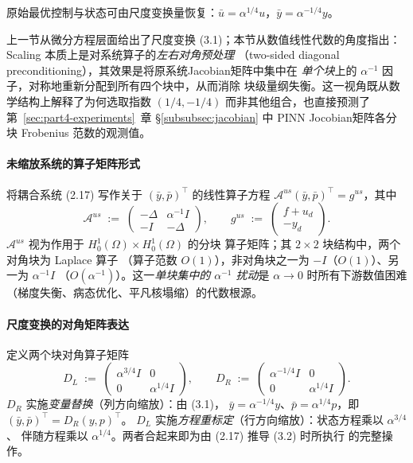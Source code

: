 \documentclass{xmu}
\theoremstyle{plain}
\theoremstyle{remark}
\begin{document}
原始最优控制与状态可由尺度变换量恢复：$\bar{u} = \alpha^{1/4}u$，$\bar{y} = \alpha^{-1/4}y$。


\label{subsec:jacobian-balancing}

上一节从微分方程层面给出了尺度变换 (3.1)；本节从数值线性代数的角度指出：
Scaling 本质上是对系统算子的\emph{左右对角预处理}
（two-sided diagonal preconditioning），其效果是将原系统Jacobian矩阵中集中在
\emph{单个块}上的 $\alpha^{-1}$ 因子，对称地重新分配到所有四个块中，从而消除
块级量纲失衡。这一视角既从数学结构上解释了为何选取指数 $(1/4,-1/4)$
而非其他组合，也直接预测了第~\ref{sec:part4-experiments}~章
§\ref{subsubsec:jacobian} 中 PINN Jocobian矩阵各分块 Frobenius 范数的观测值。

\paragraph{未缩放系统的算子矩阵形式}
将耦合系统 (2.17) 写作关于 $(\bar y,\bar p)^{\top}$ 的线性算子方程
$\mathcal{A}^{us}(\bar y,\bar p)^{\top} = g^{us}$，其中
\begin{equation}
\mathcal{A}^{us} \;:=\; \begin{pmatrix} -\Delta & \alpha^{-1}I \\[2pt] -I & -\Delta \end{pmatrix},
\qquad
g^{us} \;:=\; \begin{pmatrix} f+u_d \\[2pt] -y_d \end{pmatrix}.
\label{eq:A-us}
\end{equation}
$\mathcal{A}^{us}$ 视为作用于 $H_0^1(\Omega)\times H_0^1(\Omega)$ 的分块
算子矩阵；其 $2\times 2$ 块结构中，两个对角块为 Laplace 算子
（算子范数 $O(1)$），非对角块之一为 $-I$（$O(1)$）、另一为 $\alpha^{-1}I$
（$O(\alpha^{-1})$）。这一\emph{单块集中的 $\alpha^{-1}$ 扰动}是 $\alpha\to 0$
时所有下游数值困难（梯度失衡、病态优化、平凡核塌缩）的代数根源。

\paragraph{尺度变换的对角矩阵表达}
定义两个块对角算子矩阵
\begin{equation}
D_L \;:=\; \begin{pmatrix} \alpha^{3/4}I & 0 \\[2pt] 0 & \alpha^{1/4}I \end{pmatrix},
\qquad
D_R \;:=\; \begin{pmatrix} \alpha^{-1/4}I & 0 \\[2pt] 0 & \alpha^{1/4}I \end{pmatrix}.
\label{eq:DLR}
\end{equation}
$D_R$ 实施\emph{变量替换}（列方向缩放）：由 (3.1)，
$\bar y = \alpha^{-1/4}y$、$\bar p = \alpha^{1/4}p$，即
$(\bar y,\bar p)^{\top} = D_R(y,p)^{\top}$。
$D_L$ 实施\emph{方程重标定}（行方向缩放）：状态方程乘以 $\alpha^{3/4}$、
伴随方程乘以 $\alpha^{1/4}$。两者合起来即为由 (2.17) 推导 (3.2) 时所执行
的完整操作。
\end{document}
